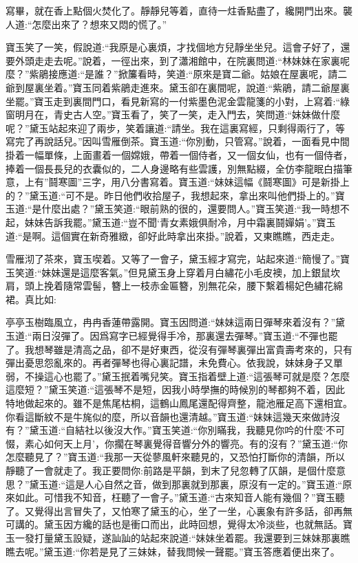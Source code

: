 \begin{parag}
    寫畢，就在香上點個火焚化了。靜靜兒等着，直待一炷香點盡了，纔開門出來。襲人道:“怎麼出來了？想來又悶的慌了。”
\end{parag}

\begin{parag}
    寶玉笑了一笑，假說道:“我原是心裏煩，才找個地方兒靜坐坐兒。這會子好了，還要外頭走走去呢。”說着，一徑出來，到了瀟湘館中，在院裏問道:“林妹妹在家裏呢麼？”紫鵑接應道:“是誰？”掀簾看時，笑道:“原來是寶二爺。姑娘在屋裏呢，請二爺到屋裏坐着。”寶玉同着紫鵑走進來。黛玉卻在裏間呢，說道:“紫鵑，請二爺屋裏坐罷。”寶玉走到裏間門口，看見新寫的一付紫墨色泥金雲龍箋的小對，上寫着:“綠窗明月在，青史古人空。”寶玉看了，笑了一笑，走入門去，笑問道:“妹妹做什麼呢？”黛玉站起來迎了兩步，笑着讓道:“請坐。我在這裏寫經，只剩得兩行了，等寫完了再說話兒。”因叫雪雁倒茶。寶玉道:“你別動，只管寫。”說着，一面看見中間掛着一幅單條，上面畫着一個嫦娥，帶着一個侍者，又一個女仙，也有一個侍者，捧着一個長長兒的衣囊似的，二人身邊略有些雲護，別無點綴，全仿李龍眠白描筆意，上有”鬪寒圖”三字，用八分書寫着。寶玉道:“妹妹這幅《鬪寒圖》可是新掛上的？”黛玉道:“可不是。昨日他們收拾屋子，我想起來，拿出來叫他們掛上的。”寶玉道:“是什麼出處？”黛玉笑道:“眼前熟的很的，還要問人。”寶玉笑道:“我一時想不起，妹妹告訴我罷。”黛玉道:“豈不聞‘青女素娥俱耐冷，月中霜裏鬪嬋娟’。”寶玉道:“是啊。這個實在新奇雅緻，卻好此時拿出來掛。”說着，又東瞧瞧，西走走。
\end{parag}


\begin{parag}
    雪雁沏了茶來，寶玉喫着。又等了一會子，黛玉經才寫完，站起來道:“簡慢了。”寶玉笑道:“妹妹還是這麼客氣。”但見黛玉身上穿着月白繡花小毛皮襖，加上銀鼠坎肩，頭上挽着隨常雲髻，簪上一枝赤金匾簪，別無花朵，腰下繫着楊妃色繡花綿裙。真比如:
\end{parag}


\begin{qute2sp}
    亭亭玉樹臨風立，冉冉香蓮帶露開。寶玉因問道:“妹妹這兩日彈琴來着沒有？”黛玉道:“兩日沒彈了。因爲寫字已經覺得手冷，那裏還去彈琴。”寶玉道:“不彈也罷了。我想琴雖是清高之品，卻不是好東西，從沒有彈琴裏彈出富貴壽考來的，只有彈出憂思怨亂來的。再者彈琴也得心裏記譜，未免費心。依我說，妹妹身子又單弱，不操這心也罷了。”黛玉抿着嘴兒笑。寶玉指着壁上道:“這張琴可就是麼？怎麼這麼短？”黛玉笑道:“這張琴不是短，因我小時學撫的時候別的琴都夠不着，因此特地做起來的。雖不是焦尾枯桐，這鶴山鳳尾還配得齊整，龍池雁足高下還相宜。你看這斷紋不是牛旄似的麼，所以音韻也還清越。”寶玉道:“妹妹這幾天來做詩沒有？”黛玉道:“自結社以後沒大作。”寶玉笑道:“你別瞞我，我聽見你吟的什麼‘不可惙，素心如何天上月’，你擱在琴裏覺得音響分外的響亮。有的沒有？”黛玉道:“你怎麼聽見了？”寶玉道:“我那一天從蓼風軒來聽見的，又恐怕打斷你的清韻，所以靜聽了一會就走了。我正要問你:前路是平韻，到末了兒忽轉了仄韻，是個什麼意思？”黛玉道:“這是人心自然之音，做到那裏就到那裏，原沒有一定的。”寶玉道:“原來如此。可惜我不知音，枉聽了一會子。”黛玉道:“古來知音人能有幾個？”寶玉聽了。又覺得出言冒失了，又怕寒了黛玉的心，坐了一坐，心裏象有許多話，卻再無可講的。黛玉因方纔的話也是衝口而出，此時回想，覺得太冷淡些，也就無話。寶玉一發打量黛玉設疑，遂訕訕的站起來說道:“妹妹坐着罷。我還要到三妹妹那裏瞧瞧去呢。”黛玉道:“你若是見了三妹妹，替我問候一聲罷。”寶玉答應着便出來了。
\end{qute2sp}


